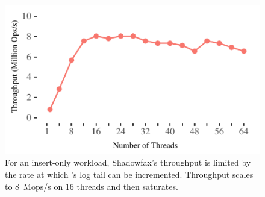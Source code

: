 \begin{figure}[t]
\centering
\includegraphics[width=0.9\columnwidth]{graphs/append-only.pdf}
\caption{For an insert-only workload, Shadowfax's throughput is
    limited by the rate at which \faster's log tail can be incremented.
    Throughput scales to 8~Mops/s on 16 threads and then saturates.}
\label{fig:thread-scalability-append}
\end{figure}
